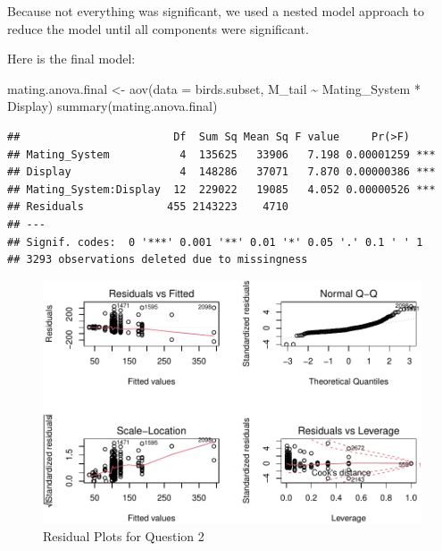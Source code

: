 \documentclass[
  12pt,
]{article}
\newenvironment{Shaded}{\begin{snugshade}}{\end{snugshade}}
\newcommand{\AttributeTok}[1]{\textcolor[rgb]{0.77,0.63,0.00}{#1}}
\newcommand{\FunctionTok}[1]{\textcolor[rgb]{0.00,0.00,0.00}{#1}}
\newcommand{\NormalTok}[1]{#1}
\newcommand{\OtherTok}[1]{\textcolor[rgb]{0.56,0.35,0.01}{#1}}
\newcommand{\SpecialCharTok}[1]{\textcolor[rgb]{0.00,0.00,0.00}{#1}}
\begin{document}
\newpage

Because not everything was significant, we used a nested model approach
to reduce the model until all components were significant.

Here is the final model:

\begin{Shaded}
\begin{Highlighting}[]
\NormalTok{mating.anova.final }\OtherTok{\textless{}{-}} \FunctionTok{aov}\NormalTok{(}\AttributeTok{data =}\NormalTok{ birds.subset, M\_tail }\SpecialCharTok{\textasciitilde{}}\NormalTok{ Mating\_System }\SpecialCharTok{*}\NormalTok{ Display)}
\FunctionTok{summary}\NormalTok{(mating.anova.final)}
\end{Highlighting}
\end{Shaded}

\begin{verbatim}
##                        Df  Sum Sq Mean Sq F value     Pr(>F)    
## Mating_System           4  135625   33906   7.198 0.00001259 ***
## Display                 4  148286   37071   7.870 0.00000386 ***
## Mating_System:Display  12  229022   19085   4.052 0.00000526 ***
## Residuals             455 2143223    4710                       
## ---
## Signif. codes:  0 '***' 0.001 '**' 0.01 '*' 0.05 '.' 0.1 ' ' 1
## 3293 observations deleted due to missingness
\end{verbatim}

\begin{figure}
\centering
\includegraphics{Project_Code_files/figure-latex/q-2 residual-1.pdf}
\caption{Residual Plots for Question 2}
\end{figure}

\newpage
\end{document}
